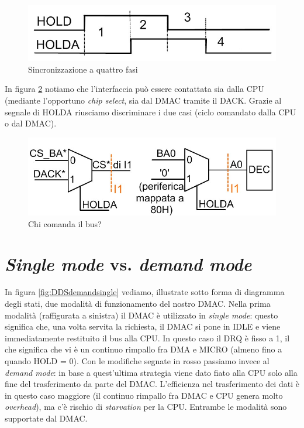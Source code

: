 \begin{figure}[!h]
\centering
\includegraphics[width=0.75\columnwidth]{img/4waysHandshake}
\caption{Sincronizzazione a quattro fasi}
\label{fig:4waysHandshake}
\end{figure}

In figura \ref{fig:chiComanda} notiamo che l'interfaccia può essere contattata sia dalla CPU (mediante l'opportuno \textit{chip select}, sia dal DMAC tramite il DACK. Grazie al segnale di HOLDA riusciamo discriminare i due casi (ciclo comandato dalla CPU o dal DMAC).

\begin{figure}[!h]
\centering
\includegraphics[width=0.75\columnwidth]{img/chiComanda}
\caption{Chi comanda il bus?}
\label{fig:chiComanda}
\end{figure}

\section{\textit{Single mode} vs. \textit{demand mode}}
\label{sec:singleDemand}

In figura \ref{fig:DDSdemandsingle} vediamo, illustrate sotto forma di diagramma degli stati, due modalità di funzionamento del nostro DMAC. 
Nella prima modalità (raffigurata a sinistra) il DMAC è utilizzato in \textit{single mode}: questo significa che, una volta servita la richiesta, il DMAC si pone in IDLE e viene immediatamente restituito il bus alla CPU. In questo caso il DRQ è fisso a 1, il che significa che vi è un continuo rimpallo fra DMA e MICRO (almeno fino a quando HOLD = 0).
Con le modifiche segnate in rosso passiamo invece al \textit{demand mode}: in base a quest'ultima strategia viene dato fiato alla CPU solo alla fine del trasferimento da parte del DMAC. L'efficienza nel trasferimento dei dati è in questo caso maggiore (il continuo rimpallo fra DMAC e CPU genera molto \textit{overhead}), ma c'è rischio di \textit{starvation} per la CPU.
Entrambe le modalità sono supportate dal DMAC.

